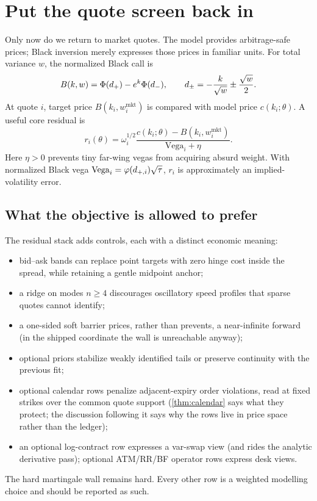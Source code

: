 \documentclass[11pt]{article}
\begin{document}
\section{Put the quote screen back in}
\label{sec:screen}

Only now do we return to market quotes.  The model provides arbitrage-safe
prices; Black inversion merely expresses those prices in familiar units.
For total variance $w$, the normalized Black call is
\begin{equation}
B(k,w)=\Phi(d_+)-e^k\Phi(d_-),\qquad
d_\pm=-\frac{k}{\sqrt w}\pm\frac{\sqrt w}{2}.
\label{eq:black_call}
\end{equation}
At quote $i$, target price $B(k_i,w_i^{\mathrm{mkt}})$ is compared with model
price $c(k_i;\theta)$.  A useful core residual is
\begin{equation}
r_i(\theta)=
\omega_i^{1/2}
\frac{c(k_i;\theta)-B(k_i,w_i^{\mathrm{mkt}})}
     {\mathrm{Vega}_i+\eta}.
\label{eq:vega_residual}
\end{equation}
Here $\eta>0$ prevents tiny far-wing vegas from acquiring absurd weight.
With normalized Black vega
$\mathrm{Vega}_i=\varphi(d_{+,i})\sqrt{\tau}$, $r_i$ is approximately an
implied-volatility error.

\subsection{What the objective is allowed to prefer}

The residual stack adds controls, each with a distinct economic meaning:
\begin{itemize}[leftmargin=1.4em]
\item bid--ask bands can replace point targets with zero hinge cost inside the
  spread, while retaining a gentle midpoint anchor;
\item a ridge on modes $n\ge4$ discourages oscillatory speed profiles that
  sparse quotes cannot identify;
\item a one-sided soft barrier prices, rather than prevents, a near-infinite
  forward (in the shipped coordinate the wall is unreachable anyway);
\item optional priors stabilize weakly identified tails or preserve continuity
  with the previous fit;
\item optional calendar rows penalize adjacent-expiry order violations, read
  at fixed strikes over the common quote support (\cref{thm:calendar} says
  what they protect; the discussion following it says why the rows live in
  price space rather than the ledger);
\item an optional log-contract row expresses a var-swap view (and rides the
  analytic derivative pass); optional ATM/RR/BF operator rows express desk
  views.
\end{itemize}
The hard martingale wall remains hard.  Every other row is a weighted modelling
choice and should be reported as such.
\end{document}

